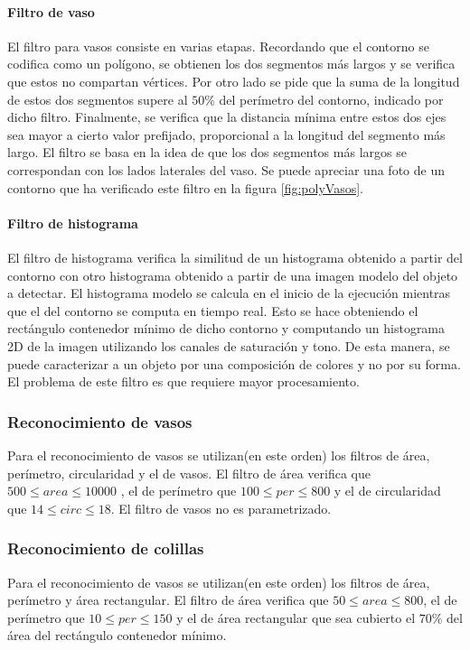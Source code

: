 	\paragraph{Filtro de vaso}
	El filtro para vasos consiste en varias etapas. Recordando que el contorno se codifica como un pol\'igono, se obtienen los dos segmentos 
	m\'as largos y se verifica que estos no compartan v\'ertices. Por otro lado se pide que la suma de la longitud de estos dos segmentos supere al $50\%$ del 
	per\'imetro del contorno, indicado por dicho filtro. Finalmente, se verifica que la distancia m\'inima entre estos dos ejes sea mayor a cierto valor prefijado, proporcional a la
	longitud del segmento m\'as largo. El filtro se basa en la idea de que 
	los dos segmentos m\'as largos se correspondan con los lados laterales 
	del vaso.  Se puede apreciar una foto  de un contorno que ha 
	verificado este filtro en la figura \ref{fig:polyVasos}. 
	\paragraph{Filtro de histograma}
	El filtro de histograma verifica la similitud de un histograma obtenido a partir del contorno con otro histograma obtenido a partir de 
	una imagen modelo del objeto a detectar. El histograma modelo se calcula en el inicio de la ejecuci\'on mientras que el del contorno se
	computa en tiempo real. Esto se hace obteniendo el rect\'angulo 
	contenedor m\'inimo de dicho contorno y computando un histograma 2D de la imagen
	utilizando los canales de saturaci\'on y tono. De esta manera, se 
	puede caracterizar a un objeto por una composici\'on de colores y no por su forma. El 
	problema de este filtro es que requiere mayor procesamiento.
	
	\subsubsection{Reconocimiento de vasos}
	Para el reconocimiento de vasos se utilizan(en este orden) los filtros de \'area, per\'imetro, circularidad y el de vasos.
	El filtro de \'area verifica que $500 \leq area \leq 10000 $ , el de 
	per\'imetro que $100 \leq per \leq 800 $ y el de circularidad
	que $14 \leq circ \leq 18$. El filtro de vasos no es parametrizado. 
	
	\subsubsection{Reconocimiento de colillas}
	Para el reconocimiento de vasos se utilizan(en este orden) los filtros de \'area, per\'imetro y \'area rectangular.
	El filtro de \'area verifica que $50 \leq area \leq 800 $, el de per\'imetro que $10 \leq per \leq 150 $ y el de \'area rectangular
	que sea cubierto el $70\%$ del \'area del rect\'angulo contenedor m\'inimo.
	
